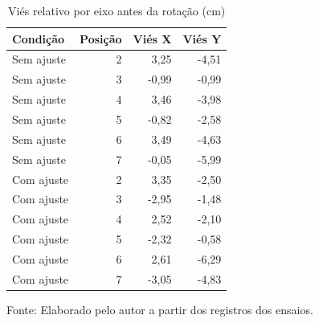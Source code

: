 \begin{table}[H]\centering
\caption{Viés relativo por eixo antes da rotação (cm)}\label{tab:reanalise-vies-relativo}
\small\begin{tabular}{lrrr}\toprule
Condição & Posição & Viés X & Viés Y\\\midrule
Sem ajuste & 2 & 3,25 & -4,51\\
Sem ajuste & 3 & -0,99 & -0,99\\
Sem ajuste & 4 & 3,46 & -3,98\\
Sem ajuste & 5 & -0,82 & -2,58\\
Sem ajuste & 6 & 3,49 & -4,63\\
Sem ajuste & 7 & -0,05 & -5,99\\
Com ajuste & 2 & 3,35 & -2,50\\
Com ajuste & 3 & -2,95 & -1,48\\
Com ajuste & 4 & 2,52 & -2,10\\
Com ajuste & 5 & -2,32 & -0,58\\
Com ajuste & 6 & 2,61 & -6,29\\
Com ajuste & 7 & -3,05 & -4,83\\
\bottomrule\end{tabular}\par\smallskip
{\footnotesize Fonte: Elaborado pelo autor a partir dos registros dos ensaios.}\end{table}
